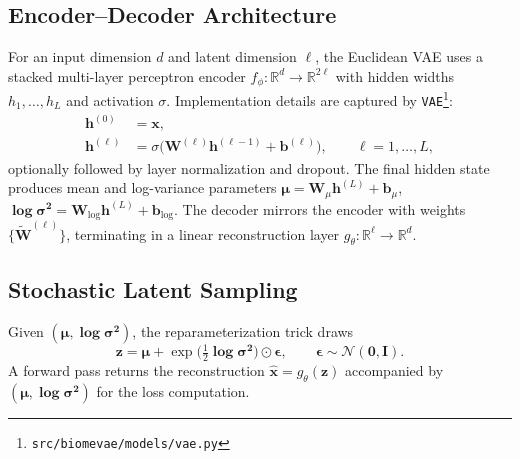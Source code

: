 \documentclass[11pt]{article}
\begin{document}
\subsection{Encoder--Decoder Architecture}
For an input dimension $d$ and latent dimension $\ell$, the Euclidean VAE uses a
stacked multi-layer perceptron encoder $f_{\phi} : \mathbb{R}^d \to \mathbb{R}^{2\ell}$
with hidden widths $h_1,\dots,h_L$ and activation $\sigma$. Implementation details are
captured by \texttt{VAE}\footnote{\texttt{src/biomevae/models/vae.py}}:
\begin{align}
    \bm{h}^{(0)} &= \bm{x},\\
    \bm{h}^{(\ell)} &= \sigma\bigl(\mathbf{W}^{(\ell)} \bm{h}^{(\ell-1)} + \bm{b}^{(\ell)}\bigr), \qquad \ell=1,\dots,L,
\end{align}
optionally followed by layer normalization and dropout. The final hidden state produces
mean and log-variance parameters $\bm{\mu} = \mathbf{W}_{\mu} \bm{h}^{(L)} + \bm{b}_{\mu}$,
$\bm{\log\sigma^2} = \mathbf{W}_{\log} \bm{h}^{(L)} + \bm{b}_{\log}$. The decoder
mirrors the encoder with weights $\{\tilde{\mathbf{W}}^{(\ell)}\}$, terminating in a
linear reconstruction layer $g_{\theta} : \mathbb{R}^{\ell} \to \mathbb{R}^{d}$.
\subsection{Stochastic Latent Sampling}
Given $(\bm{\mu}, \bm{\log\sigma^2})$, the reparameterization trick draws
\begin{equation}
    \bm{z} = \bm{\mu} + \exp\bigl(\tfrac{1}{2}\bm{\log\sigma^2}\bigr) \odot \bm{\epsilon},
    \qquad \bm{\epsilon} \sim \mathcal{N}(\bm{0}, \mathbf{I}).
\end{equation}
A forward pass returns the reconstruction $\hat{\bm{x}} = g_{\theta}(\bm{z})$
accompanied by $(\bm{\mu},\bm{\log\sigma^2})$ for the loss computation.
\end{document}
